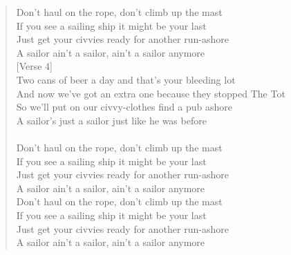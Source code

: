 \documentclass[11pt]{article}
\begin{document}
\begin{verse}
Don't haul on the rope, don't climb up the mast\\
If you see a sailing ship it might be your last\\
Just get your civvies ready for another run-ashore\\
A sailor ain't a sailor, ain't a sailor anymore\\
\vspace*{1em}
[Verse 4]\\
Two cans of beer a day and that's your bleeding lot\\
And now we've got an extra one because they stopped The Tot\\
So we'll put on our civvy-clothes find a pub ashore\\
A sailor's just a sailor just like he was before\\
[Chorus]\\
Don't haul on the rope, don't climb up the mast\\
If you see a sailing ship it might be your last\\
Just get your civvies ready for another run-ashore\\
A sailor ain't a sailor, ain't a sailor anymore\\
Don't haul on the rope, don't climb up the mast\\
If you see a sailing ship it might be your last\\
Just get your civvies ready for another run-ashore\\
A sailor ain't a sailor, ain't a sailor anymore\\
\end{verse}
\clearpage
\end{document}
